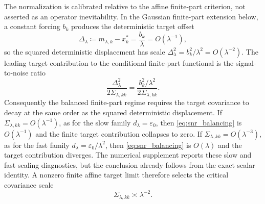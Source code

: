 \documentclass[preprint,12pt]{elsarticle}
\theoremstyle{plain}
\theoremstyle{definition}
\theoremstyle{remark}
\begin{document}
    The normalization is calibrated relative to the affine finite-part criterion,
    not asserted as an operator inevitability.  In the Gaussian finite-part
    extension below, a constant forcing $b_k$ produces the deterministic target
    offset
    \begin{equation}
        \label{eq:target_offset_balancing}
        \Delta_\lambda \coloneqq m_{\lambda,k}-x_k^* = \frac{b_k}{\lambda}=O(\lambda^{-1}),
    \end{equation}
    so the squared deterministic displacement has scale
    $\Delta_\lambda^2=b_k^2/\lambda^2=O(\lambda^{-2})$.  The leading target
    contribution to the conditional finite-part functional is the
    signal-to-noise ratio
    \begin{equation}
        \label{eq:snr_balancing}
        \frac{\Delta_\lambda^2}{2\Sigma_{\lambda,kk}}
        =
        \frac{b_k^2/\lambda^2}{2\Sigma_{\lambda,kk}}.
    \end{equation}
    Consequently the balanced finite-part regime requires the target covariance
    to decay at the same order as the squared deterministic displacement.  If
    $\Sigma_{\lambda,kk}=O(\lambda^{-1})$, as for the slow family
    $d_\lambda=\varepsilon_0$, then \eqref{eq:snr_balancing} is
    $O(\lambda^{-1})$ and the finite target contribution collapses to zero.  If
    $\Sigma_{\lambda,kk}=O(\lambda^{-3})$, as for the fast family
    $d_\lambda=\varepsilon_0/\lambda^2$, then \eqref{eq:snr_balancing} is
    $O(\lambda)$ and the target contribution diverges.  The numerical supplement
    reports these slow and fast scaling diagnostics, but the conclusion already
    follows from the exact scalar identity.  A nonzero finite affine target limit
    therefore selects the critical covariance scale
    \begin{equation}
        \label{eq:critical_covariance_scale}
        \Sigma_{\lambda,kk}\asymp\lambda^{-2}.
    \end{equation}
\end{document}
